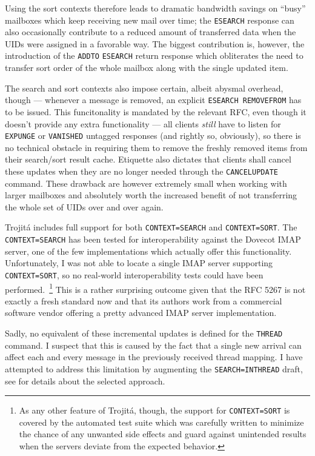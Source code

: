 \documentclass[trojita]{subfiles}
\begin{document}
Using the sort contexts therefore leads to dramatic bandwidth savings on ``busy'' mailboxes which keep receiving new
mail over time; the {\tt ESEARCH} response can also occasionally contribute to a reduced amount of transferred data when
the UIDs were assigned in a favorable way.  The biggest contribution is, however, the introduction of the {\tt ADDTO}
{\tt ESEARCH} return response which obliterates the need to transfer sort order of the whole mailbox along with the
single updated item.

The search and sort contexts also impose certain, albeit abysmal overhead, though --- whenever a message is removed, an
explicit {\tt ESEARCH REMOVEFROM} has to be issued.  This funcitonality is mandated by the relevant RFC, even though it
doesn't provide any extra functionality --- all clients {\em still} have to listen for {\tt EXPUNGE} or {\tt VANISHED}
untagged responses (and rightly so, obviously), so there is no technical obstacle in requiring them to remove the
freshly removed items from their search/sort result cache.  Etiquette also dictates that clients shall cancel these
updates when they are no longer needed through the {\tt CANCELUPDATE} command.  These drawback are however extremely
small when working with larger mailboxes and absolutely worth the increased benefit of not transferring the whole set of
UIDs over and over again.

\begin{trojitabehavior}
Trojitá includes full support for both {\tt CONTEXT=SEARCH} and {\tt CONTEXT=SORT}.  The {\tt CONTEXT=SEARCH} has been
tested for interoperability against the Dovecot IMAP server, one of the few implementations which actually offer this
functionality.  Unfortunately, I was not able to locate a single IMAP server supporting {\tt CONTEXT=SORT}, so no
real-world interoperability tests could have been performed.~\footnote{As any other feature of Trojitá, though, the
support for {\tt CONTEXT=SORT} is covered by the automated test suite which was carefully written to minimize the chance
of any unwanted side effects and guard against unintended results when the servers deviate from the expected behavior.}
This is a rather surprising outcome given that the RFC 5267 is not exactly a fresh standard now and that its authors
work from a commercial software vendor offering a pretty advanced IMAP server implementation.
\end{trojitabehavior}

Sadly, no equivalent of these incremental updates is defined for the {\tt THREAD} command.  I suspect that this is
caused by the fact that a single new arrival can affect each and every message in the previously received thread
mapping.  I have attempted to address this limitation by augmenting the {\tt SEARCH=INTHREAD} draft, see
 for details about the selected approach.
\end{document}
